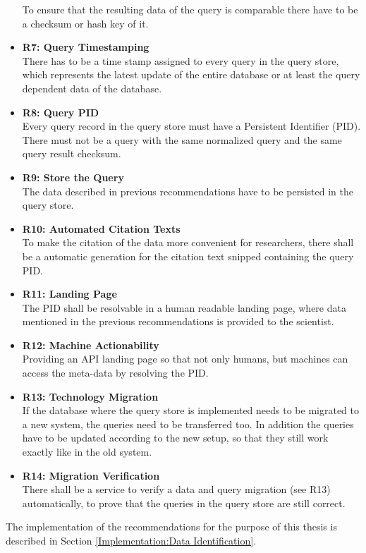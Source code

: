 \documentclass[draft,final]{vutinfth} %
\begin{document}
\begin{itemize}
	To ensure that the resulting data of the query is comparable there have to be a checksum or hash key of it. 
	\item \textbf{R7: Query Timestamping} \\
	There has to be a time stamp assigned to every query in the query store, which represents the latest update of the entire database or at least the query dependent data of the database.
	\item \textbf{R8: Query PID}\\
	Every query record in the query store must have a Persistent Identifier (PID). There must not be a query with the same normalized query and the same query result checksum. 
	\item \textbf{R9: Store the Query} \\
	The data described in previous recommendations have to be persisted in the query store.
	\item \textbf{R10: Automated Citation Texts} \\
	To make the citation of the data more convenient for researchers, there shall be a automatic generation for the citation text snipped containing the query PID.
	\item \textbf{R11: Landing Page} \\
	The PID shall be resolvable in a human readable landing page, where data mentioned in the previous recommendations is provided to the scientist.
	\item \textbf{R12: Machine Actionability} \\
	Providing an API landing page so that not only humans, but machines can access the meta-data by resolving the PID.
	\item \textbf{R13: Technology Migration} \\
	If the database where the query store is implemented needs to be migrated to a new system, the queries need to be transferred too. In addition the queries have to be updated according to the new setup, so that they still work exactly like in the old system.
	\item \textbf{R14: Migration Verification} \\
	There shall be a service to verify a data and query migration (see R13) automatically, to prove that the queries in the query store are still correct. 
\end{itemize}
The implementation of the recommendations for the purpose of this thesis is described in Section \ref{Implementation:Data Identification}. 
\end{document}
